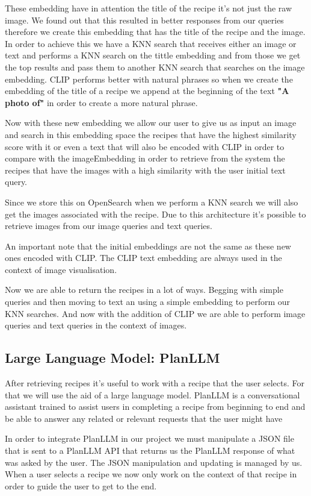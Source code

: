 \documentclass[runningheads]{llncs}
\begin{document}
These embedding have in attention the title of the recipe it's not just the raw image. We found out that this resulted in better responses from our queries therefore we create this embedding that has the title of the recipe and the image. In order to achieve this we have a KNN search that receives either an image or text and performs a KNN search on the tittle embedding and from those we get the top results and pass them to another KNN search that searches on the image embedding. CLIP performs better with natural phrases so when we create the embedding of the title of a recipe we append at the beginning of the text \textbf{"A photo of"} in order to create a more natural phrase.

Now with these new embedding we allow our user to give us as input an image and search in this embedding space the recipes that have the highest similarity score with it or even a text that will also be encoded with CLIP in order to compare with the imageEmbedding in order to retrieve from the system the recipes that have the images with a high similarity with the user initial text query.

Since we store this on OpenSearch when we perform a KNN search we will also get the images associated with the recipe. Due to this architecture it's possible to retrieve images from our image queries and text queries.

An important note that the initial embeddings are not the same as these new ones encoded with CLIP. The CLIP text embedding are always used in the context of image visualisation.

Now we are able to return the recipes in a lot of ways. Begging with simple queries and then moving to text an using a simple embedding to perform our KNN searches. And now with the addition of CLIP we are able to perform image queries and text queries in the context of images.

\subsection{Large Language Model: PlanLLM}
After retrieving recipes it's useful to work with a recipe that the user selects. For that we will use the aid of a large language model. PlanLLM is a conversational assistant trained to assist users in completing a recipe from beginning to end and be able to answer any related or relevant requests that the user might have ~\cite{planllmeacl24}

In order to integrate PlanLLM in our project we must manipulate a JSON file that is sent to a PlanLLM API that returns us the PlanLLM response of what was asked by the user. The JSON manipulation and updating is managed by us. When a user selects a recipe we now only work on the context of that recipe in order to guide the user to get to the end. 
\end{document}
